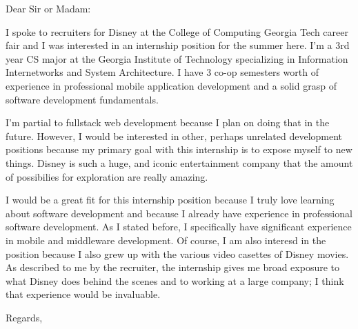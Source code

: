 \documentclass{letter}
\begin{document}
\begin{letter}{}
\opening{Dear Sir or Madam:}

I spoke to recruiters for Disney at the College of Computing Georgia Tech career fair and I was interested in an internship position for the summer here. I'm a 3rd year CS major at the Georgia Institute of Technology specializing in Information Internetworks and System Architecture. I have 3 co-op semesters worth of experience in professional mobile application development and a solid grasp of software development fundamentals. 

I'm partial to fullstack web development because I plan on doing that in the future. However, I would be interested in other, perhaps unrelated development positions because my primary goal with this internship is to expose myself to new things. Disney is such a huge, and iconic entertainment company that the amount of possibilies for exploration are really amazing.

I would be a great fit for this internship position because I truly love learning about software development and because I already have experience in professional software development.  As I stated before, I specifically have significant experience in mobile and middleware development. Of course, I am also interesd in the position because I also grew up with the various video casettes of Disney movies. As described to me by the recruiter, the internship gives me broad exposure to what Disney does behind the scenes and to working at a large company; I think that experience would be invaluable.


\closing{Regards,}
\end{letter}
\end{document}
